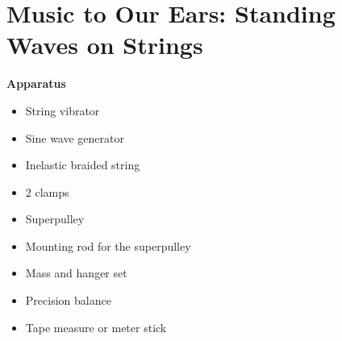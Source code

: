 \section{Music to Our Ears: Standing Waves on Strings}

\makelabheader %

\bigskip

\textbf{Apparatus}
\begin{itemize} [nosep] 
\item  String vibrator 
\item  Sine wave generator
\item  Inelastic braided string
\item  2 clamps
\item  Superpulley
\item  Mounting rod for the superpulley
\item  Mass and hanger set
\item  Precision balance
\item  Tape measure or meter stick
\end{itemize}

